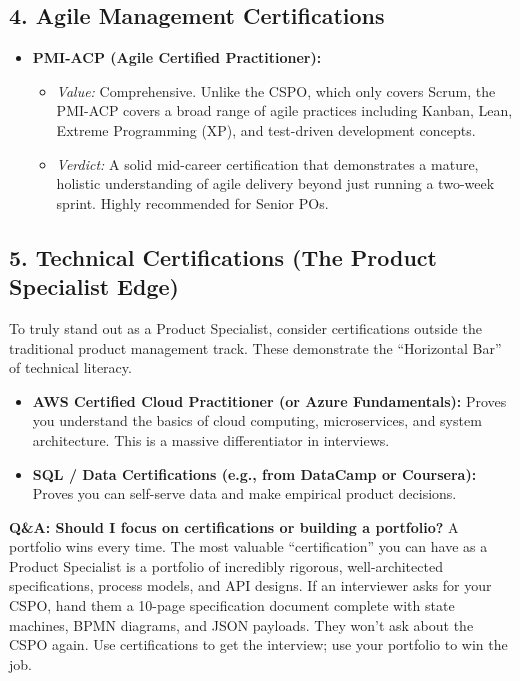 \documentclass[
  11pt,
  openany,
  oneside]{book}
\providecommand{\tightlist}{%
  \setlength{\itemsep}{0pt}\setlength{\parskip}{0pt}}
\renewenvironment{quote}{\begin{customquote}}{\end{customquote}}
\begin{document}
\subsection{4. Agile Management
Certifications}\label{agile-management-certifications}

\begin{itemize}
\tightlist
\item
  \textbf{PMI-ACP (Agile Certified Practitioner):}

  \begin{itemize}
  \tightlist
  \item
    \emph{Value:} Comprehensive. Unlike the CSPO, which only covers
    Scrum, the PMI-ACP covers a broad range of agile practices including
    Kanban, Lean, Extreme Programming (XP), and test-driven development
    concepts.
  \item
    \emph{Verdict:} A solid mid-career certification that demonstrates a
    mature, holistic understanding of agile delivery beyond just running
    a two-week sprint. Highly recommended for Senior POs.
  \end{itemize}
\end{itemize}

\subsection{5. Technical Certifications (The Product Specialist
Edge)}\label{technical-certifications-the-product-specialist-edge}

To truly stand out as a Product Specialist, consider certifications
outside the traditional product management track. These demonstrate the
``Horizontal Bar'' of technical literacy.

\begin{itemize}
\tightlist
\item
  \textbf{AWS Certified Cloud Practitioner (or Azure Fundamentals):}
  Proves you understand the basics of cloud computing, microservices,
  and system architecture. This is a massive differentiator in
  interviews.
\item
  \textbf{SQL / Data Certifications (e.g., from DataCamp or Coursera):}
  Proves you can self-serve data and make empirical product decisions.
\end{itemize}

\begin{quote}
\textbf{Q\&A: Should I focus on certifications or building a portfolio?}
A portfolio wins every time. The most valuable ``certification'' you can
have as a Product Specialist is a portfolio of incredibly rigorous,
well-architected specifications, process models, and API designs. If an
interviewer asks for your CSPO, hand them a 10-page specification
document complete with state machines, BPMN diagrams, and JSON payloads.
They won't ask about the CSPO again. Use certifications to get the
interview; use your portfolio to win the job.
\end{quote}
\end{document}
